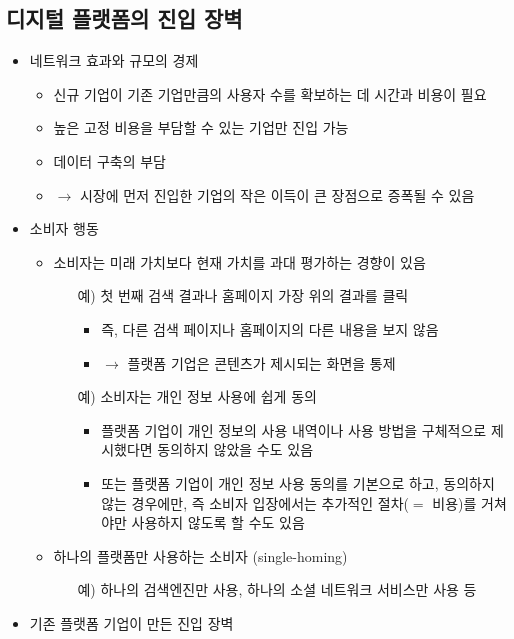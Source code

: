 \subsection{디지털 플랫폼의 진입 장벽}
\begin{itemize}
\item 네트워크 효과와 규모의 경제
	\begin{itemize}
	\item 신규 기업이 기존 기업만큼의 사용자 수를 확보하는 데 시간과 비용이 필요
	\item 높은 고정 비용을 부담할 수 있는 기업만 진입 가능
	\item 데이터 구축의 부담
	\item $\rightarrow$ 시장에 먼저 진입한 기업의 작은 이득이 큰 장점으로 증폭될 수 있음
	\end{itemize}
\item 소비자 행동
	\begin{itemize}
	\item 소비자는 미래 가치보다 현재 가치를 과대 평가하는 경향이 있음 \citep{Thaler:2018aa}
		\begin{itemize}
		\item[예)] 첫 번째 검색 결과나 홈페이지 가장 위의 결과를 클릭
			\begin{itemize}
			\item 즉, 다른 검색 페이지나 홈페이지의 다른 내용을 보지 않음
			\item $\rightarrow$ 플랫폼 기업은 콘텐츠가 제시되는 화면을 통제
			\end{itemize}
		\item[예)] 소비자는 개인 정보 사용에 쉽게 동의
			\begin{itemize}
			\item 플랫폼 기업이 개인 정보의 사용 내역이나 사용 방법을 구체적으로 제시했다면 동의하지 않았을 수도 있음
			\item 또는 플랫폼 기업이 개인 정보 사용 동의를 기본으로 하고, 동의하지 않는 경우에만, 즉 소비자 입장에서는 추가적인 절차($=$ 비용)를 거쳐야만 사용하지 않도록 할 수도 있음
			\end{itemize} 
		\end{itemize}
	\item 하나의 플랫폼만 사용하는 소비자 (single-homing)
		\begin{itemize}
		\item[예)] 하나의 검색엔진만 사용, 하나의 소셜 네트워크 서비스만 사용 등
		\end{itemize}	
	\end{itemize}
\item 기존 플랫폼 기업이 만든 진입 장벽

\end{itemize}

